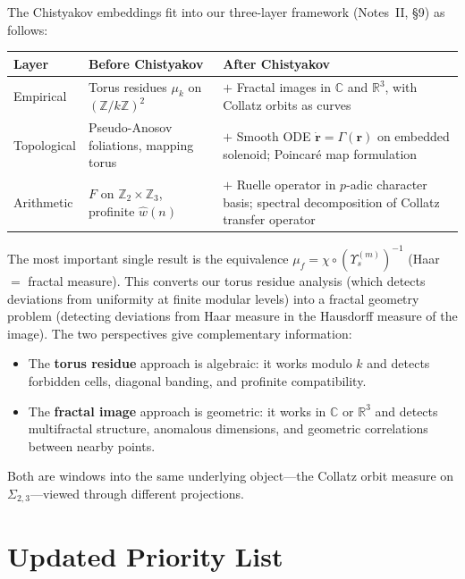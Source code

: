 \documentclass[11pt,a4paper]{article}
\newcommand{\Z}{\mathbb{Z}}
\newcommand{\R}{\mathbb{R}}
\newcommand{\C}{\mathbb{C}}
\theoremstyle{plain}
\theoremstyle{definition}
\begin{document}
The Chistyakov embeddings fit into our three-layer framework (Notes~II, \S9) as follows:

\begin{center}
\renewcommand{\arraystretch}{1.4}
\small
\begin{tabular}{lp{5cm}p{5cm}}
    \toprule
    \textbf{Layer} & \textbf{Before Chistyakov} & \textbf{After Chistyakov} \\
    \midrule
    Empirical & Torus residues $\mu_k$ on $(\Z/k\Z)^2$ & $+$ Fractal images in $\C$ and $\R^3$, with Collatz orbits as curves \\[6pt]
    Topological & Pseudo-Anosov foliations, mapping torus & $+$ Smooth ODE $\dot{\mathbf{r}} = \Gamma(\mathbf{r})$ on embedded solenoid; Poincar\'e map formulation \\[6pt]
    Arithmetic & $F$ on $\Z_2 \times \Z_3$, profinite $\hat{w}(n)$ & $+$ Ruelle operator in $p$-adic character basis; spectral decomposition of Collatz transfer operator \\
    \bottomrule
\end{tabular}
\end{center}

The most important single result is the equivalence $\mu_f = \chi \circ (\Upsilon_s^{(m)})^{-1}$ (Haar $=$ fractal measure). This converts our torus residue analysis (which detects deviations from uniformity at finite modular levels) into a fractal geometry problem (detecting deviations from Haar measure in the Hausdorff measure of the image). The two perspectives give complementary information:

\begin{itemize}
    \item The \textbf{torus residue} approach is algebraic: it works modulo $k$ and detects forbidden cells, diagonal banding, and profinite compatibility.
    \item The \textbf{fractal image} approach is geometric: it works in $\C$ or $\R^3$ and detects multifractal structure, anomalous dimensions, and geometric correlations between nearby points.
\end{itemize}

Both are windows into the same underlying object---the Collatz orbit measure on $\Sigma_{2,3}$---viewed through different projections.


\section{Updated Priority List}\label{sec:priorities}
\end{document}

